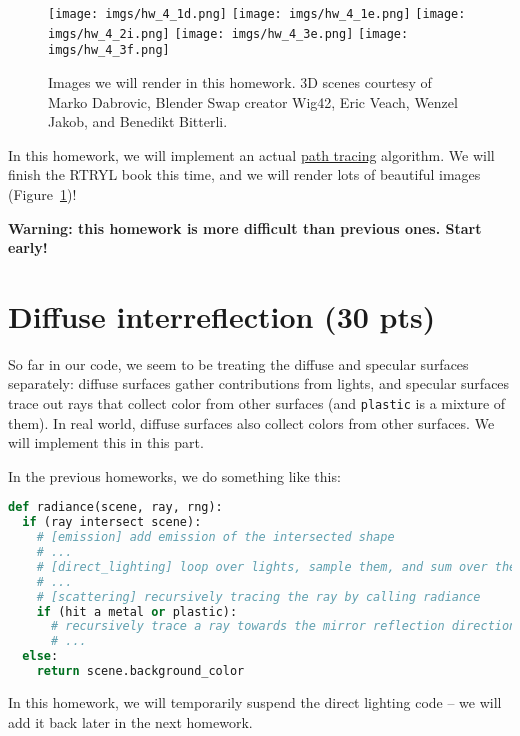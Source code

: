 
\usepackage{xcolor}




\begin{figure}[ht]
    \centering
    \texttt{[image: imgs/hw\_4\_1d.png]}
    \texttt{[image: imgs/hw\_4\_1e.png]}
    \texttt{[image: imgs/hw\_4\_2i.png]}
    \texttt{[image: imgs/hw\_4\_3e.png]}
    \texttt{[image: imgs/hw\_4\_3f.png]}
    \caption{Images we will render in this homework. 3D scenes courtesy of Marko Dabrovic, Blender Swap creator Wig42, Eric Veach, Wenzel Jakob, and Benedikt Bitterli.}
    \label{fig:teaser}
\end{figure}

In this homework, we will implement an actual \href{https://en.wikipedia.org/wiki/Path_tracing}{path tracing} algorithm. We will finish the RTRYL book this time, and we will render lots of beautiful images (Figure~\ref{fig:teaser})!

\textbf{Warning: this homework is more difficult than previous ones. Start early!}

\section{Diffuse interreflection (30 pts)}
So far in our code, we seem to be treating the diffuse and specular surfaces separately: diffuse surfaces gather contributions from lights, and specular surfaces trace out rays that collect color from other surfaces (and \lstinline{plastic} is a mixture of them). In real world, diffuse surfaces also collect colors from other surfaces. We will implement this in this part.

In the previous homeworks, we do something like this:
\begin{lstlisting}[language=python]
def radiance(scene, ray, rng):
  if (ray intersect scene):
    # [emission] add emission of the intersected shape
    # ...
    # [direct_lighting] loop over lights, sample them, and sum over their contributions
    # ...
    # [scattering] recursively tracing the ray by calling radiance
    if (hit a metal or plastic):
      # recursively trace a ray towards the mirror reflection direction
      # ...
  else:
    return scene.background_color
\end{lstlisting}

In this homework, we will temporarily suspend the direct lighting code -- we will add it back later in the next homework.

